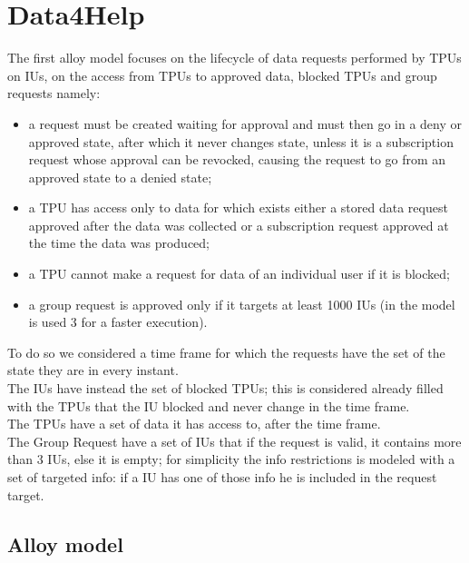\section{Data4Help}
The first alloy model focuses on the lifecycle of data requests performed by TPUs on IUs, on the access from TPUs to approved data, blocked TPUs and group requests namely:
\begin{itemize}
\item a request must be created waiting for approval and must then go in a deny or approved state, after which it never changes state, unless it is a subscription request whose approval can be revocked, causing the request to go from an approved state to a denied state;
\item a TPU has access only to data for which exists either a stored data request approved after the data was collected or a subscription request approved at the time the data was produced;
\item a TPU cannot make a request for data of an individual user if it is blocked;
\item a group request is approved only if it targets at least 1000 IUs (in the model is used 3 for a faster execution).
\end{itemize}
To do so we considered a time frame for which the requests have the set of the state they are in every instant.  \\
The IUs have instead the set of blocked TPUs; this is considered already filled with the TPUs that the IU blocked and never change in the time frame. \\ 
The TPUs have a set of data it has access to, after the time frame. \\
The Group Request have a set of IUs that if the request is valid, it contains more than 3 IUs, else it is empty; for simplicity the info restrictions is modeled with a set of targeted info: if a IU has one of those info he is included in the request target.
\\
\subsection{Alloy model}

